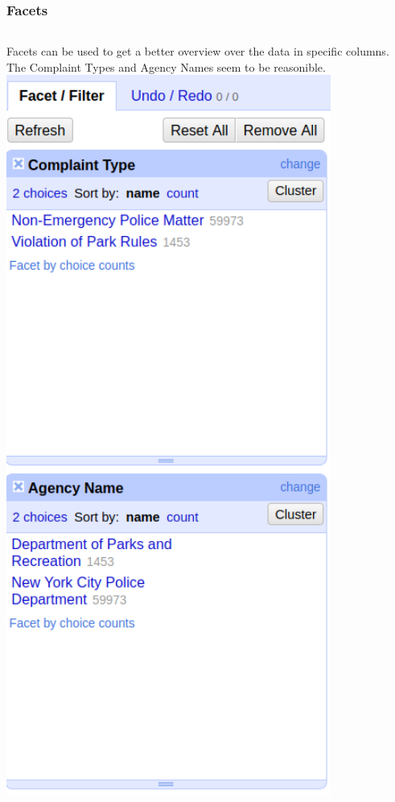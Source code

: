 \documentclass{beamer}
\begin{document}
\begin{frame}

\frametitle{Facets}
\begin{columns}
Facets can be used to get a better overview over the data in specific columns.
The Complaint Types and Agency Names seem to be reasonible.
\includegraphics[width = 0.8\textwidth]{pictures/facets.png}
\end{columns}
\end{frame}
\end{document}
